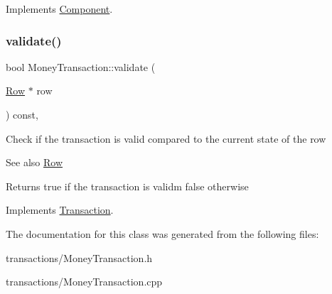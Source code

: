 Implements \mbox{\hyperlink{classComponent_a3e63d8c993e417a4af3f56d65ebfc7ea}{Component}}.

\mbox{\label{classMoneyTransaction_a20c58901a2aa8c51b73d56000545e82c}} 
\subsubsection{\texorpdfstring{validate()}{validate()}}
{\footnotesize\ttfamily bool Money\+Transaction\+::validate (\begin{DoxyParamCaption}\item[{\mbox{\hyperlink{classRow}{Row}} $\ast$}]{row }\end{DoxyParamCaption}) const\hspace{0.3cm}{\ttfamily [override]}, {\ttfamily [virtual]}}

Check if the transaction is valid compared to the current state of the row \begin{DoxySeeAlso}{See also}
\mbox{\hyperlink{classRow}{Row}}
\end{DoxySeeAlso}
\begin{DoxyReturn}{Returns}
true if the transaction is validm false otherwise 
\end{DoxyReturn}


Implements \mbox{\hyperlink{classTransaction_a638518143f0defde1c3c73e33db1b7f1}{Transaction}}.



The documentation for this class was generated from the following files\+:\begin{DoxyCompactItemize}
\item 
transactions/Money\+Transaction.\+h\item 
transactions/Money\+Transaction.\+cpp\end{DoxyCompactItemize}
